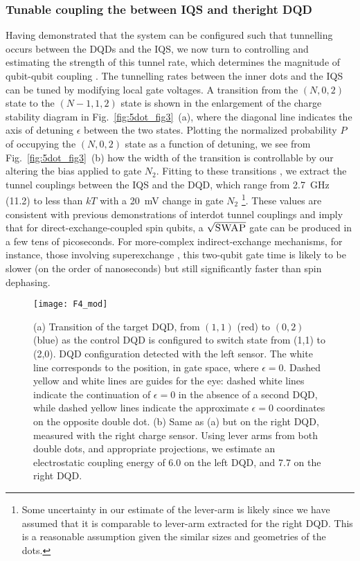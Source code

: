 \subsubsection{Tunable coupling the between IQS and theright DQD}
Having demonstrated that the system can be configured such that tunnelling occurs between the DQDs and the IQS, we now turn to controlling and estimating the strength of this tunnel rate, which determines the magnitude of qubit-qubit coupling \cite{bluhm,superexchange,srinivasa}. The tunnelling rates between the inner dots and the IQS can be tuned by modifying local gate voltages. A transition from the $(N,0,2)$ state to the $(N-1,1,2)$ state is shown in the enlargement of the charge stability diagram in Fig.~\ref{fig:5dot_fig3}~(a), where the diagonal line indicates the axis of detuning $\epsilon$ between the two states. Plotting the normalized probability $P$ of occupying the $(N,0,2)$ state as a function of detuning, we see from Fig.~\ref{fig:5dot_fig3}~(b) how the width of the transition is controllable by our altering the bias applied to gate $N_2$. Fitting to these transitions \cite{dicarlo}, we extract the tunnel couplings between the IQS and the DQD, which range from \SI{2.7}{\giga\hertz} (\SI{11.2}{\uev}) to less than $kT$ with a \SI{20}{\milli\volt} change in gate $N_2$ \footnote{Some uncertainty in our estimate of the lever-arm is likely since we have assumed that it is comparable to lever-arm extracted for the right DQD. This is a reasonable assumption given the similar sizes and geometries of the dots.}. These values are consistent with previous demonstrations of interdot tunnel couplings \cite{superexchange,petta} and imply that for direct-exchange-coupled spin qubits, a $\sqrt{\textsc{SWAP}}$ gate can be produced in a few tens of picoseconds. For more-complex indirect-exchange mechanisms, for instance, those involving superexchange \cite{bluhm,superexchange}, this two-qubit gate time is likely to be slower (on the order of nanoseconds) but still significantly faster than spin dephasing. 

\begin{figure}
\texttt{[image: F4\_mod]}
\caption{\label{fig:5dot_fig4} (a) Transition of the target DQD, from $(1,1)$ (red) to $(0,2)$ (blue) as the control DQD is configured to switch state from (1,1) to (2,0). DQD configuration detected with the left sensor. The white line corresponds to the position, in gate space, where $\epsilon = 0$. Dashed yellow and white lines are guides for the eye: dashed white lines indicate the continuation of $\epsilon = 0$ in the absence of a second DQD, while dashed yellow lines indicate the approximate $\epsilon = 0$ coordinates on the opposite double dot.  (b)  Same as (a) but on the right DQD, measured with the right charge sensor. Using lever arms from both double dots, and appropriate projections, we estimate an electrostatic coupling energy of \SI{6.0}{\uev} on the left DQD, and \SI{7.7}{\uev} on the right DQD.}
\end{figure}

